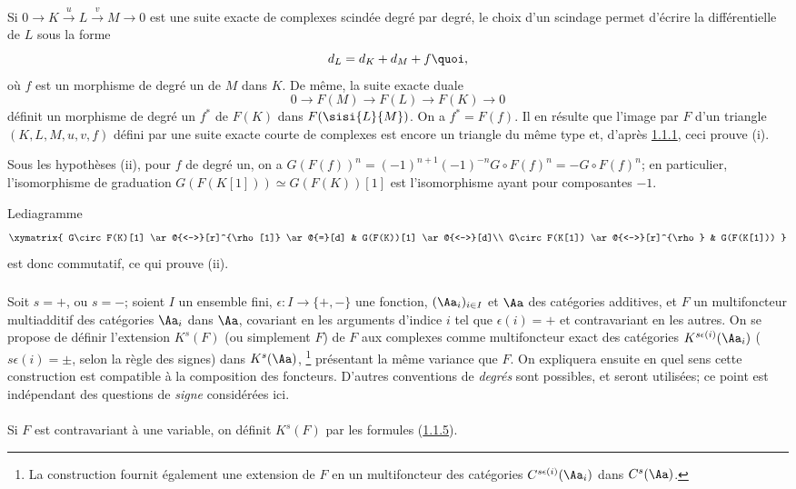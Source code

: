 \documentclass[10pt]{../fichiers-configuration-latex/smfart}
\begin{document}
Si $0\rightarrow K\xrightarrow{u} L\xrightarrow{v} M\rightarrow 0$ est
une suite exacte de complexes scindée degré par degré, le choix d'un
scindage permet d'écrire la différentielle de $L$ sous la forme
\[
d_L=d_K+d_M+f{\quoi},
\]
où $f$ est un morphisme de degré un de $M$ dans $K$. De même, la suite
exacte duale
\[
0\longrightarrow F(M)\longrightarrow F(L)\longrightarrow
F(K)\longrightarrow 0
\]
définit un morphisme de degré un $f^{\ast}$ de $F(K)$ dans $F(\sisi{L}{M})$. On
a $f^{\ast}=F(f)$. Il en résulte que l'image par $F$ d'un triangle
$(K,L,M,u,v,f)$ défini par une suite exacte courte de complexes est
encore un triangle du même type et, d'après \hyperref[XVII.subsubsec1.1.1]{1.1.1}, ceci prouve (i).

Sous les hypothèses (ii), pour $f$ de degré un, on a
$G(F(f))^{n}=(-1)^{n+1}(-1)^{-n}G\circ F(f)^{n}=-G\circ F(f)^{n}$; en
particulier, l'isomorphisme de graduation $G(F(K[1]))\simeq
G(F(K))[1]$ est l'isomorphisme ayant pour composantes $-1$.

Le\pageoriginale diagramme
\[
\xymatrix{
G\circ F(K)[1]  \ar@{<->}[r]^{\rho[1]} \ar@{=}[d] & G(F(K))[1] \ar@{<->}[d]\\
G\circ F(K[1])  \ar@{<->}[r]^{\rho} & G(F(K[1]))
}
\]
est donc commutatif, ce qui prouve (ii).

\subsubsection{}
Soit $s=+$, ou $s=-$; soient $I$ un ensemble fini,
$\epsilon:I\rightarrow \{+,-\}$ une fonction, $(\Aa_i)_{i\in
  I}$ et $\Aa$ des catégories additives, et $F$ un
multifoncteur multiadditif des catégories $\Aa_i$ dans
$\Aa$, covariant en les arguments d'indice $i$ tel que
$\epsilon(i)=+$ et contravariant en les autres. On se propose de
définir l'extension $K^{s}(F)$ (ou simplement $F$) de $F$ aux
complexes comme multifoncteur exact des catégories
$K^{s\epsilon(i)}(\Aa_i)$ ($s\epsilon(i)=\pm$, selon la règle
des signes) dans $K^{s}(\Aa)$, \footnote[1]{La construction
  fournit également une extension de $F$ en un multifoncteur des
  catégories $C^{s\epsilon(i)}(\Aa_i)$ dans
  $C^{s}(\Aa)$.} présentant la même variance que $F$. On
expliquera ensuite en quel sens cette construction est compatible à la
composition des foncteurs. D'autres conventions de \emph{degrés} sont
possibles, et seront utilisées; ce point est indépendant des questions
de \emph{signe} considérées ici.

\paragraph{}
Si $F$ est contravariant à une variable, on définit $K^{s}(F)$ par les
formules (\hyperref[XVII.subsubsec1.1.5]{1.1.5}).
\end{document}

